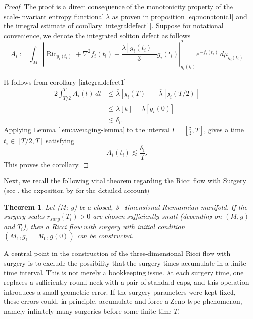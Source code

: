 \documentclass{amsart}
\newtheorem{theorem}{Theorem}[section]
\begin{document}
\begin{proof} The proof is a direct consequence of the monotonicity property of the scale-invariant entropy functional $\overline{\lambda}$ as proven in proposition \ref{eq:monotonic1} and the integral estimate of corollary \ref{integraldefect1}. Suppose for notational convenience, we denote the integrated soliton defect as follows 
\[
A_{i}:=\int_M
        \left|
        \operatorname{Ric}_{g_i(t_i)}
        +
        \nabla^2 f_i(t_i)
        -
        \frac{\lambda[g_i(t_i)]}{3}g_i(t_i)
        \right|_{g_i(t_i)}^2
        e^{-f_i(t_i)}\,d\mu_{g_i(t_i)}
\]

\noindent It follows from corollary \ref{integraldefect1}
\begin{align}
        2\int_{T/2}^{T}A_i(t)\,dt
        &\leq
        \overline{\lambda}[g_i(T)]
        -
        \overline{\lambda}[g_i(T/2)]                                    \\
        &\leq
        \overline{\lambda}[h]
        -
        \overline{\lambda}[g_i(0)]                                      \\
        &\lesssim
        \delta_i.
\end{align}
Applying Lemma \ref{lem:averaging-lemma} to the interval $I=\left[\frac{T}{2},T\right]$,
gives a time \(t_i\in[T/2,T]\) satisfying
\[
        A_i(t_i)
        \lesssim
        \frac{\delta_i}{T}.
\]
This proves the corollary.
\end{proof}
\noindent Next, we recall the following vital theorem regarding the Ricci flow with Surgery (see \cite{perelman2003ricci}, the exposition by \cite{cao2006complete} for the detailed account)
\begin{theorem}
Let (M; g) be a closed, 3-
dimensional Riemannian manifold. If the
surgery scales $r_{surg}(T_{i}) > 0$ are chosen sufficiently small (depending on $(M,g)$ and $T_{i}$), then a Ricci 
flow with surgery with initial condition $(M_{1},g_{1}=M_{0},g(0))$ can be constructed. 
\end{theorem}
\noindent A central point in the construction of the three-dimensional Ricci flow with
surgery is to exclude the possibility that the surgery times accumulate in a
finite time interval.  This is not merely a bookkeeping issue.  At each surgery
time, one replaces a sufficiently round neck with a pair of standard caps, and this
operation introduces a small geometric error.  If the surgery parameters were
kept fixed, these errors could, in principle, accumulate and force a Zeno-type
phenomenon, namely infinitely many surgeries before some finite time \(T\).
\end{document}
